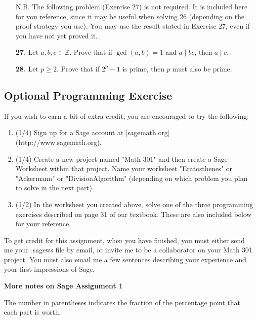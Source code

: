 \documentclass[12pt,reqno]{amsart}
\begin{document}
\begin{enumerate}
N.B. The following problem (Exercise 27) is not required. It is included here for you reference, since it may be useful when solving 26 (depending on the proof strategy you use). You may use the result stated in Exercise 27, even if you have not yet proved it.

\item[{\bf 27.}]
Let $a, b, c \in {\mathbb Z}$.  Prove that if $\gcd(a,b) = 1$ and $a  \mid bc$, then $a  \mid  c$. 

 
\item[{\bf 28.}]
Let $p \geq 2$.  Prove that if $2^p-1$ is prime, then $p$ must also be prime.

\end{enumerate}

\newpage 
 
\subsection*{Optional Programming Exercise}
 
If you wish to earn a bit of extra credit, you are encouraged to try the following:

\begin{enumerate}
\item 
(1/4) Sign up for a Sage account at [sagemath.org](http://www.sagemath.org).  

\item (1/4) Create a new project named "Math 301" and then create a Sage Worksheet
  within that project.  Name your worksheet "Eratosthenes" or "Ackermann" or
  "DivisionAlgorithm" (depending on which problem you plan to solve in the next part).

\item (1/2) In the worksheet you created above, solve one of the three programming
  exercises described on page 31 of our textbook.  These are also included below for your reference.
\end{enumerate}

To get credit for this assignment, when you have finished, you must either send
me your .sagews file by email, or invite me to be a collaborator on your Math 301
project. You must also email me a few sentences describing your experience and
your first impressions of Sage.

{\bf More notes on Sage Assignment 1}

The number in parentheses indicates the fraction of the percentage point that
each part is worth.
\end{document}
